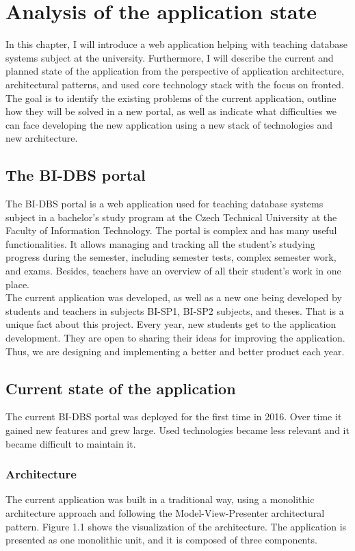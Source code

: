\chapter{Analysis of the application state}

In this chapter, I will introduce a web application helping with teaching database systems subject at the university.
Furthermore, I will describe the current and planned state of the application from the perspective of application architecture, architectural patterns, and used core technology stack with the focus on fronted. The goal is to identify the existing problems of the current application, outline how they will be solved in a new portal, as well as indicate what difficulties we can face developing the new application using a new stack of technologies and new architecture.

\section{The BI-DBS portal}
The BI-DBS portal is a web application used for teaching database systems subject in a bachelor's study program at the Czech Technical University at the Faculty of Information Technology. The portal is complex and has many useful functionalities. It allows managing and tracking all the student's studying progress during the semester, including semester tests, complex semester work, and exams. Besides, teachers have an overview of all their student's work in one place.\\
The current application was developed, as well as a new one being developed by students and teachers in subjects BI-SP1, BI-SP2 subjects, and theses. That is a unique fact about this project. Every year, new students get to the application development. They are open to sharing their ideas for improving the application. Thus, we are designing and implementing a better and better product each year.


\section{Current state of the application}
The current BI-DBS portal was deployed for the first time in 2016. Over time it gained new features and grew large. Used technologies became less relevant and it became difficult to maintain it.

\subsection{Architecture}
The current application was built in a traditional way, using a monolithic architecture approach and following the Model-View-Presenter architectural pattern\cite{potel_mvp}. Figure 1.1 shows the visualization of the architecture. The application is presented as one monolithic unit, and it is composed  of three components. 

